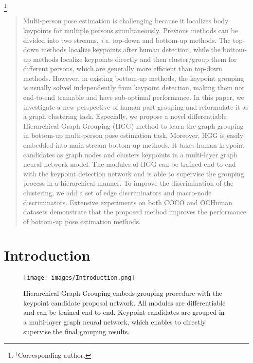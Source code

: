 \documentclass[runningheads]{llncs}
\newcommand\blfootnote[1]{\begingroup
	\renewcommand\thefootnote{}\footnote{#1}\addtocounter{footnote}{-1}\endgroup
}
\newcommand{\ie}{\textit{i}.\textit{e}. }
\begin{document}
	\blfootnote{$^{\dagger}$Corresponding author.}
	\begin{abstract}
		Multi-person pose estimation is challenging because it localizes body keypoints for multiple persons simultaneously. Previous methods can be divided into two streams, \ie top-down and bottom-up methods. The top-down methods localize keypoints after human detection, while the bottom-up methods localize keypoints directly and then cluster/group them for different persons, which are generally more efficient than top-down methods. However, in existing bottom-up methods, the keypoint grouping is usually solved independently from keypoint detection, making them not end-to-end trainable and have sub-optimal performance. In this paper, we investigate a new perspective of human part grouping and reformulate it as a graph clustering task. Especially, we propose a novel differentiable Hierarchical Graph Grouping (HGG) method to learn the graph grouping in bottom-up multi-person pose estimation task. Moreover, HGG is easily embedded into main-stream bottom-up methods. It takes human keypoint candidates as graph nodes and clusters keypoints in a multi-layer graph neural network model. The modules of HGG can be trained end-to-end with the keypoint detection network and is able to supervise the grouping process in a hierarchical manner. To improve the discrimination of the clustering, we add a set of edge discriminators and macro-node discriminators. Extensive experiments on both COCO and OCHuman datasets demonstrate that the proposed method improves the performance of bottom-up pose estimation methods.
	\end{abstract}
	
\section{Introduction}
	
	\begin{figure}
		\begin{center}
			\texttt{[image: images/Introduction.png]}
		\end{center}
		\caption{ Hierarchical Graph Grouping embeds grouping procedure with the keypoint candidate proposal network. All modules are differentiable and can be trained end-to-end. Keypoint candidates are grouped in a multi-layer graph neural network, which enables to directly supervise the final grouping results. }
		\label{fig:motivation}
	\end{figure}
	
\end{document}
